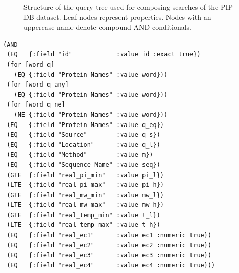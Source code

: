 \begin{figure}[t]
\centering
{}
\caption[Structure of the query tree for composing searches]
        {Structure of the query tree used for composing searches of
          the PIP-DB dataset. Leaf nodes represent properties. Nodes
          with an uppercase name denote compound AND conditionals.}
\label{fig:query-tree}
\end{figure}


\lstset{language=Clojure}
\begin{lstlisting}[label=lst:query-tree,caption={%
      [Clojure implementation of the query tree]
      Implementation of the query tree in Clojure, from the file
      \texttt{query.clj}. Note the flat query hierarchy and the
      use of the \texttt{for} macro for expanding multivalued
      queries.}]
(AND
 (EQ   {:field "id"            :value id :exact true})
 (for [word q]
   (EQ {:field "Protein-Names" :value word}))
 (for [word q_any]
   (EQ {:field "Protein-Names" :value word}))
 (for [word q_ne]
   (NE {:field "Protein-Names" :value word}))
 (EQ   {:field "Protein-Names" :value q_eq})
 (EQ   {:field "Source"        :value q_s})
 (EQ   {:field "Location"      :value q_l})
 (EQ   {:field "Method"        :value m})
 (EQ   {:field "Sequence-Name" :value seq})
 (GTE  {:field "real_pi_min"   :value pi_l})
 (LTE  {:field "real_pi_max"   :value pi_h})
 (GTE  {:field "real_mw_min"   :value mw_l})
 (LTE  {:field "real_mw_max"   :value mw_h})
 (GTE  {:field "real_temp_min" :value t_l})
 (LTE  {:field "real_temp_max" :value t_h})
 (EQ   {:field "real_ec1"      :value ec1 :numeric true})
 (EQ   {:field "real_ec2"      :value ec2 :numeric true})
 (EQ   {:field "real_ec3"      :value ec3 :numeric true})
 (EQ   {:field "real_ec4"      :value ec4 :numeric true}))
\end{lstlisting}


